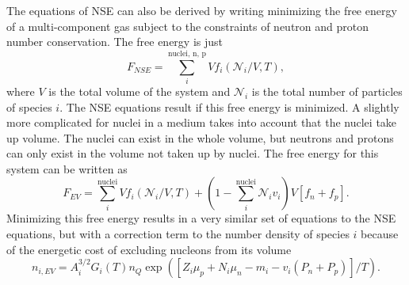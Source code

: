 \documentclass[11pt,letter]{article}
\begin{document}
The equations of NSE can also be derived by writing minimizing the free energy of a 
multi-component gas subject to the constraints of neutron and proton number
conservation.  The free energy is just 
\begin{equation}
F_{NSE} = \sum_i^{\textrm{nuclei, n, p}} V f_i(\mathcal{N}_i/V, T), 
\end{equation} 
where $V$ is the total volume of the system and $\mathcal{N}_i$ is the total number of particles of species $i$.  The NSE equations result if this free energy is minimized.  
A slightly more complicated for nuclei in a medium takes into account that the nuclei
take up volume.  The nuclei can exist in the whole volume, but neutrons and protons 
can only exist in the volume not taken up by nuclei.  The free energy for this system
can be written as 
\begin{equation}
F_{EV} = \sum_i^{\textrm{nuclei}} V f_i(\mathcal{N}_i/V, T) 
+ \left (1 - \sum_i^{\textrm{nuclei}}\mathcal{N}_i v_i\right) V \left[f_n + f_p\right].
\end{equation}
Minimizing this free energy results in a very similar set of equations to the NSE 
equations, but with a correction term to the number density of species $i$ because of 
the energetic cost of excluding nucleons from its volume 
\begin{equation}
n_{i,EV} = A_i^{3/2} G_i(T) n_Q \exp\left(\left[Z_i \mu_p + N_i \mu_n - m_i - v_i(P_n + P_p) \right]/T\right).
\end{equation} 
\end{document}
